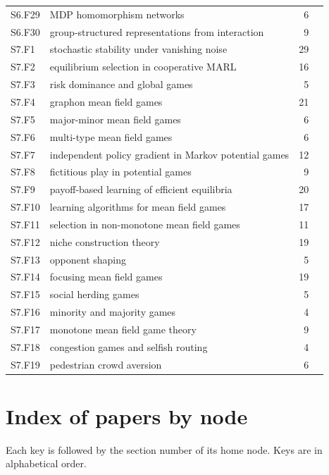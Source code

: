 \documentclass[10pt]{article}
\begin{document}
{\begin{longtable}{@{}p{1.3cm}p{8.6cm}rp{4.4cm}@{}}
S6.F29 & MDP homomorphism networks & 6 & \citet{Ravindran-model02}\\
S6.F30 & group-structured representations from interaction & 9 & \citet{Higgins-definition18}\\
S7.F1 & stochastic stability under vanishing noise & 29 & \citet{Kandori-learning93}\\
S7.F2 & equilibrium selection in cooperative MARL & 16 & \citet{Zhang-equilibrium24}\\
S7.F3 & risk dominance and global games & 5 & \citet{HarsanyiSelten-general88}\\
S7.F4 & graphon mean field games & 21 & \citet{Caines-graphon20b}\\
S7.F5 & major-minor mean field games & 6 & \citet{Huang-large10}\\
S7.F6 & multi-type mean field games & 6 & \citet{Huang-large07}\\
S7.F7 & independent policy gradient in Markov potential games & 12 & \citet{Leonardos-global21}\\
S7.F8 & fictitious play in potential games & 9 & \citet{Shapley-some64}\\
S7.F9 & payoff-based learning of efficient equilibria & 20 & \citet{Marden-achieving14}\\
S7.F10 & learning algorithms for mean field games & 17 & \citet{Cardaliaguet-learning17}\\
S7.F11 & selection in non-monotone mean field games & 11 & \citet{Delarue-exploration21}\\
S7.F12 & niche construction theory & 19 & \citet{Jones-organisms94}\\
S7.F13 & opponent shaping & 5 & \citet{Foerster-learning18}\\
S7.F14 & focusing mean field games & 19 & \citet{Cesaroni-concentration19}\\
S7.F15 & social herding games & 5 & \citet{Yin-synchronization12}\\
S7.F16 & minority and majority games & 4 & \citet{Arthur-inductive94}\\
S7.F17 & monotone mean field game theory & 9 & \citet{Lasry-mean07}\\
S7.F18 & congestion games and selfish routing & 4 & \citet{Wardrop-some52}\\
S7.F19 & pedestrian crowd aversion & 6 & \citet{Hughes-continuum02}\\
\end{longtable}}

\section{Index of papers by node}\label{app:index}
Each key is followed by the section number of its home node. Keys are in alphabetical order.
\end{document}
